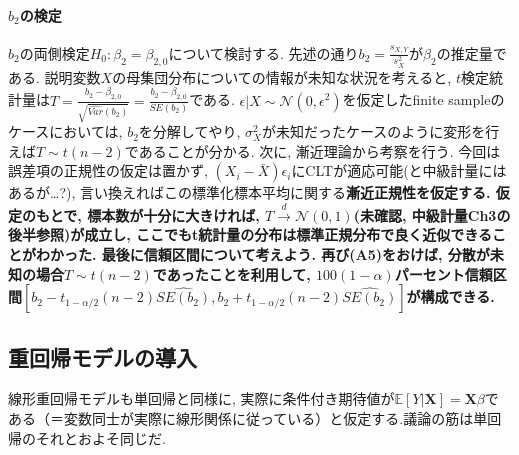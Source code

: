 \documentclass[paper=a4paper,fontsize=10pt]{jlreq}
\begin{document}
\paragraph{$b_2$の検定}
$b_2$の両側検定$H_0: \beta_2=\beta_{2,0}$について検討する. 先述の通り$b_2=\frac{s_{X,Y}}{s^{2}_{X}}$が$\beta_2$の推定量である. 説明変数$X$の母集団分布についての情報が未知な状況を考えると, $t$検定統計量は$T=\frac{b_2-\beta_{2,0}}{\sqrt{\hat{Var}(b_2)}}=\frac{b_2-\beta_{2,0}}{SE(b_2)}$である. $\epsilon|X \sim \mathcal{N}(0,\epsilon^2)$を仮定したfinite sampleのケースにおいては, $b_2$を分解してやり, $\sigma_X^2$が未知だったケースのように変形を行えば$T \sim t(n-2)$であることが分かる. 次に, 漸近理論から考察を行う. 今回は誤差項の正規性の仮定は置かず, $(X_i-\bar{X})\epsilon_i$にCLTが適応可能(と中級計量にはあるが\dots?), 言い換えればこの標準化標本平均に関する\rmfamily\mcfamily\bfseries{漸近正規性}\mdseries を仮定する. 仮定のもとで, 標本数が十分に大きければ, $T \overset{d}{\to} \mathcal{N}(0,1)$\rmfamily\mcfamily\bfseries{(未確認, 中級計量Ch3の後半参照)}\mdseries が成立し, ここでもt統計量の分布は標準正規分布で良く近似できることがわかった. 最後に信頼区間について考えよう. 再び(A5)をおけば, 分散が未知の場合$T \sim t(n-2)$であったことを利用して, $100(1-\alpha)$パーセント信頼区間$[b_2 - t_{1-\alpha / 2}(n-2) \hat{SE(b_2)}, b_2 + t_{1-\alpha / 2}(n-2) \hat{SE(b_2)}]$が構成できる.\\

\subsection{重回帰モデルの導入}
線形重回帰モデルも単回帰と同様に, 実際に条件付き期待値が$\mathbb{E}[Y|\mathbf{X}]=\mathbf{X}\beta$である（＝変数同士が実際に線形関係に従っている）と仮定する.議論の筋は単回帰のそれとおよそ同じだ.\\
\end{document}
